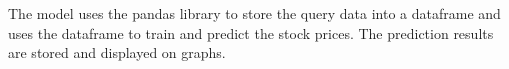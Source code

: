 \documentclass[conference]{IEEEtran}
\begin{document}








The model uses the pandas library to store the query data into a dataframe and uses the dataframe to train and predict the stock prices. The prediction results are stored and displayed on graphs. 


\setlength{\fboxrule}{2pt}
\end{document}
